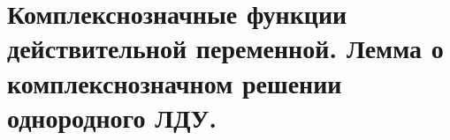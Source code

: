 {
	\section{Комплекснозначные функции действительной переменной. Лемма о комплекснозначном решении однородного
	ЛДУ.}

	\newpage
}